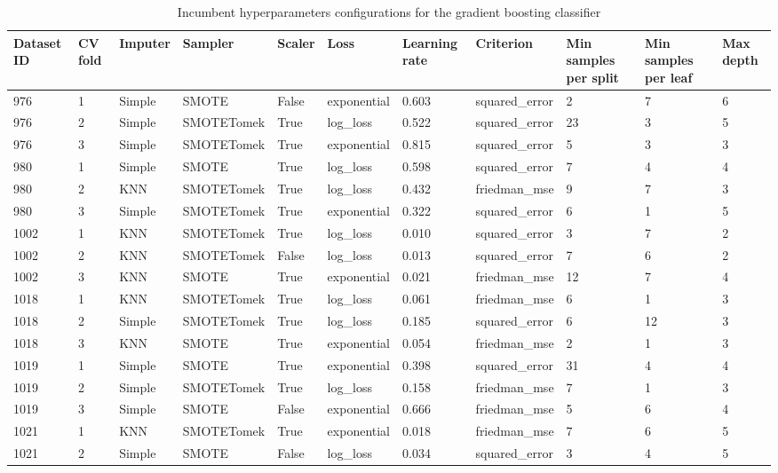 \documentclass[11pt]{article}
\begin{document}
\begin{table}
\footnotesize
\caption{Incumbent hyperparameters configurations for the gradient boosting classifier}
\center
\begin{tabular}{lllllllllll}
\toprule
Dataset ID & CV fold & Imputer & Sampler & Scaler & Loss & Learning rate & Criterion & Min samples per split & Min samples per leaf & Max depth \\
\midrule
976 & 1 & Simple & SMOTE & False & exponential & 0.603 & squared\_error & 2 & 7 & 6 \\
976 & 2 & Simple & SMOTETomek & True & log\_loss & 0.522 & squared\_error & 23 & 3 & 5 \\
976 & 3 & Simple & SMOTETomek & True & exponential & 0.815 & squared\_error & 5 & 3 & 3 \\
\midrule
980 & 1 & Simple & SMOTE & True & log\_loss & 0.598 & squared\_error & 7 & 4 & 4 \\
980 & 2 & KNN & SMOTETomek & True & log\_loss & 0.432 & friedman\_mse & 9 & 7 & 3 \\
980 & 3 & Simple & SMOTETomek & True & exponential & 0.322 & squared\_error & 6 & 1 & 5 \\
\midrule
1002 & 1 & KNN & SMOTETomek & True & log\_loss & 0.010 & squared\_error & 3 & 7 & 2 \\
1002 & 2 & KNN & SMOTETomek & False & log\_loss & 0.013 & squared\_error & 7 & 6 & 2 \\
1002 & 3 & KNN & SMOTE & True & exponential & 0.021 & friedman\_mse & 12 & 7 & 4 \\
\midrule
1018 & 1 & KNN & SMOTETomek & True & log\_loss & 0.061 & friedman\_mse & 6 & 1 & 3 \\
1018 & 2 & Simple & SMOTETomek & True & log\_loss & 0.185 & squared\_error & 6 & 12 & 3 \\
1018 & 3 & KNN & SMOTE & True & exponential & 0.054 & friedman\_mse & 2 & 1 & 3 \\
\midrule
1019 & 1 & Simple & SMOTE & True & exponential & 0.398 & squared\_error & 31 & 4 & 4 \\
1019 & 2 & Simple & SMOTETomek & True & log\_loss & 0.158 & friedman\_mse & 7 & 1 & 3 \\
1019 & 3 & Simple & SMOTE & False & exponential & 0.666 & friedman\_mse & 5 & 6 & 4 \\
\midrule
1021 & 1 & KNN & SMOTETomek & True & exponential & 0.018 & friedman\_mse & 7 & 6 & 5 \\
1021 & 2 & Simple & SMOTE & False & log\_loss & 0.034 & squared\_error & 3 & 4 & 5 \\

\end{tabular}
\end{table}
\end{document}

